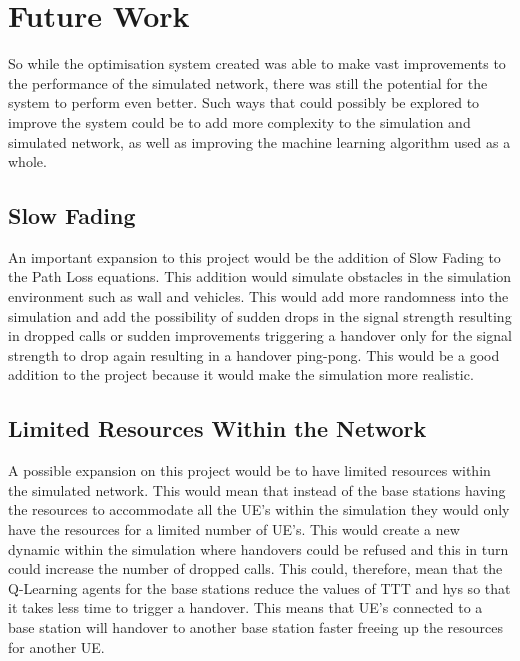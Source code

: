 \chapter{Future Work}\label{future work}
So while the optimisation system created was able to make vast improvements to the performance of the simulated network, there was still the potential for the system to perform even better. Such ways that could possibly be explored to improve the system could be to add more complexity to the simulation and simulated network, as well as improving the machine learning algorithm used as a whole.

\section{Slow Fading}
An important expansion to this project would be the addition of Slow Fading to the Path Loss equations. This addition would simulate obstacles in the simulation environment such as wall and vehicles. This would add more randomness into the simulation and add the possibility of sudden drops in the signal strength resulting in dropped calls or sudden improvements triggering a handover only for the signal strength to drop again resulting in a handover ping-pong. This would be a good addition to the project because it would make the simulation more realistic.

\section{Limited Resources Within the Network}
A possible expansion on this project would be to have limited resources within the simulated network. This would mean that instead of the base stations having the resources to accommodate all the UE's within the simulation they would only have the resources for a limited number of UE's. This would create a new dynamic within the simulation where handovers could be refused and this in turn could increase the number of dropped calls. This could, therefore, mean that the Q-Learning agents for the base stations reduce the values of TTT and hys so that it takes less time to trigger a handover. This means that UE's connected to a base station will handover to another base station faster freeing up the resources for another UE. 

